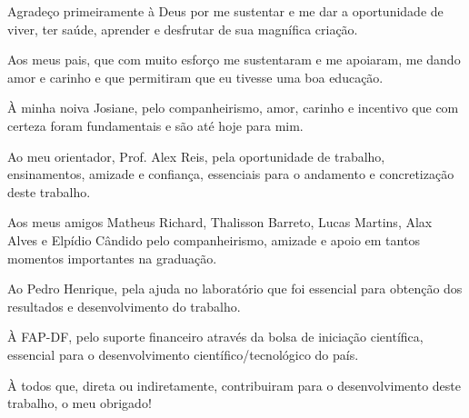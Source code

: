 \begin{agradecimentos}

Agradeço primeiramente à Deus por me sustentar e me dar a oportunidade de viver, ter saúde, 
aprender e desfrutar de sua magnífica criação.

Aos meus pais, que com muito esforço me sustentaram e me apoiaram, me dando amor e carinho 
e que permitiram que eu tivesse uma boa educação. 

À minha noiva Josiane, pelo companheirismo, amor, carinho e incentivo que com certeza foram fundamentais
e são até hoje para mim.

Ao meu orientador, Prof. Alex Reis, pela oportunidade de trabalho, ensinamentos, amizade e confiança,
essenciais para o andamento e concretização deste trabalho.

Aos meus amigos Matheus Richard, Thalisson Barreto, Lucas Martins, Alax Alves e Elpídio Cândido 
pelo companheirismo, amizade e apoio em tantos momentos importantes na graduação.

Ao Pedro Henrique, pela ajuda no laboratório que foi essencial para obtenção dos resultados e desenvolvimento do trabalho.

À FAP-DF, pelo suporte financeiro através da bolsa de iniciação científica, essencial para o desenvolvimento científico/tecnológico do país.

À todos que, direta ou indiretamente, contribuiram para o desenvolvimento deste trabalho, o meu obrigado!



\end{agradecimentos}
